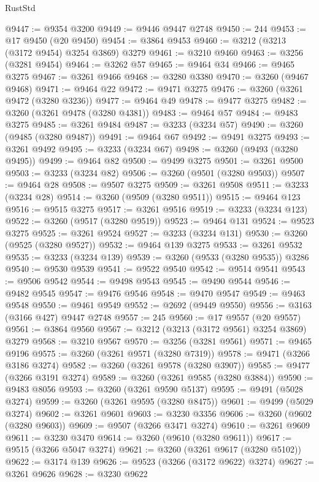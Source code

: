 \begin{lexlean}{RustStd}
\begin{coremodule}
@9447 := @9354 @3200
@9449 := @9446 @9447 @2748
@9450 := 244
@9453 := @17 @9450 (@20 @9450)
@9454 := @3864 @9453
@9460 := @3212 (@3213 (@3172 @9454) @3254 @3869) @3279
@9461 := @3210 @9460
@9463 := @3256 (@3281 @9454)
@9464 := @3262 @57
@9465 := @9464 @34
@9466 := @9465 @3275
@9467 := @3261 @9466
@9468 := @3280 @3380
@9470 := @3260 (@9467 @9468)
@9471 := @9464 @22
@9472 := @9471 @3275
@9476 := @3260 (@3261 @9472 (@3280 @3236))
@9477 := @9464 @49
@9478 := @9477 @3275
@9482 := @3260 (@3261 @9478 (@3280 @4381))
@9483 := @9464 @57
@9484 := @9483 @3275
@9485 := @3261 @9484
@9487 := @3233 (@3234 @57)
@9490 := @3260 (@9485 (@3280 @9487))
@9491 := @9464 @67
@9492 := @9491 @3275
@9493 := @3261 @9492
@9495 := @3233 (@3234 @67)
@9498 := @3260 (@9493 (@3280 @9495))
@9499 := @9464 @82
@9500 := @9499 @3275
@9501 := @3261 @9500
@9503 := @3233 (@3234 @82)
@9506 := @3260 (@9501 (@3280 @9503))
@9507 := @9464 @28
@9508 := @9507 @3275
@9509 := @3261 @9508
@9511 := @3233 (@3234 @28)
@9514 := @3260 (@9509 (@3280 @9511))
@9515 := @9464 @123
@9516 := @9515 @3275
@9517 := @3261 @9516
@9519 := @3233 (@3234 @123)
@9522 := @3260 (@9517 (@3280 @9519))
@9523 := @9464 @131
@9524 := @9523 @3275
@9525 := @3261 @9524
@9527 := @3233 (@3234 @131)
@9530 := @3260 (@9525 (@3280 @9527))
@9532 := @9464 @139 @3275
@9533 := @3261 @9532
@9535 := @3233 (@3234 @139)
@9539 := @3260 (@9533 (@3280 @9535)) @3286
@9540 := @9530 @9539
@9541 := @9522 @9540
@9542 := @9514 @9541
@9543 := @9506 @9542
@9544 := @9498 @9543
@9545 := @9490 @9544
@9546 := @9482 @9545
@9547 := @9476 @9546
@9548 := @9470 @9547
@9549 := @9463 @9548
@9550 := @9461 @9549
@9552 := @2692 (@9449 @9550)
@9556 := @3163 (@3166 @427) @9447 @2748
@9557 := 245
@9560 := @17 @9557 (@20 @9557)
@9561 := @3864 @9560
@9567 := @3212 (@3213 (@3172 @9561) @3254 @3869) @3279
@9568 := @3210 @9567
@9570 := @3256 (@3281 @9561)
@9571 := @9465 @9196
@9575 := @3260 (@3261 @9571 (@3280 @7319))
@9578 := @9471 (@3266 @3186 @3274)
@9582 := @3260 (@3261 @9578 (@3280 @3907))
@9585 := @9477 (@3266 @3191 @3274)
@9589 := @3260 (@3261 @9585 (@3280 @3884))
@9590 := @9483 @8056
@9593 := @3260 (@3261 @9590 @5137)
@9595 := @9491 (@5028 @3274)
@9599 := @3260 (@3261 @9595 (@3280 @8475))
@9601 := @9499 (@5029 @3274)
@9602 := @3261 @9601
@9603 := @3230 @3356
@9606 := @3260 (@9602 (@3280 @9603))
@9609 := @9507 (@3266 @3471 @3274)
@9610 := @3261 @9609
@9611 := @3230 @3470
@9614 := @3260 (@9610 (@3280 @9611))
@9617 := @9515 (@3266 @5047 @3274)
@9621 := @3260 (@3261 @9617 (@3280 @5102))
@9622 := @3174 @139
@9626 := @9523 (@3266 (@3172 @9622) @3274)
@9627 := @3261 @9626
@9628 := @3230 @9622

\end{coremodule}
\end{lexlean}

